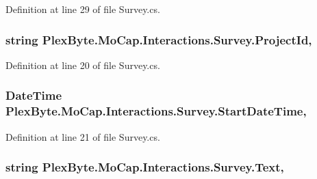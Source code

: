 Definition at line 29 of file Survey.\+cs.

\subsubsection[{\texorpdfstring{Project\+Id}{ProjectId}}]{\setlength{\rightskip}{0pt plus 5cm}string Plex\+Byte.\+Mo\+Cap.\+Interactions.\+Survey.\+Project\+Id\hspace{0.3cm}{\ttfamily [get]}, {\ttfamily [set]}}\hypertarget{class_plex_byte_1_1_mo_cap_1_1_interactions_1_1_survey_afebba71a8a4961e1cc28c18ad42b7c98}{}\label{class_plex_byte_1_1_mo_cap_1_1_interactions_1_1_survey_afebba71a8a4961e1cc28c18ad42b7c98}


Definition at line 20 of file Survey.\+cs.

\subsubsection[{\texorpdfstring{Start\+Date\+Time}{StartDateTime}}]{\setlength{\rightskip}{0pt plus 5cm}Date\+Time Plex\+Byte.\+Mo\+Cap.\+Interactions.\+Survey.\+Start\+Date\+Time\hspace{0.3cm}{\ttfamily [get]}, {\ttfamily [set]}}\hypertarget{class_plex_byte_1_1_mo_cap_1_1_interactions_1_1_survey_a890e2c1421c46175b9fb9af925b57ecf}{}\label{class_plex_byte_1_1_mo_cap_1_1_interactions_1_1_survey_a890e2c1421c46175b9fb9af925b57ecf}


Definition at line 21 of file Survey.\+cs.

\subsubsection[{\texorpdfstring{Text}{Text}}]{\setlength{\rightskip}{0pt plus 5cm}string Plex\+Byte.\+Mo\+Cap.\+Interactions.\+Survey.\+Text\hspace{0.3cm}{\ttfamily [get]}, {\ttfamily [set]}}\hypertarget{class_plex_byte_1_1_mo_cap_1_1_interactions_1_1_survey_ade12b9b3a140efb18dd061665b40224d}{}\label{class_plex_byte_1_1_mo_cap_1_1_interactions_1_1_survey_ade12b9b3a140efb18dd061665b40224d}


